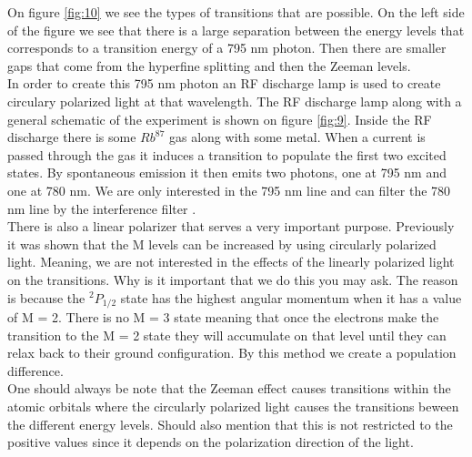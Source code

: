 \documentclass[twocolumn]{article}
\begin{document}
On figure \ref{fig:10} we see the 
types of transitions that are possible. On the left side of the figure we see 
that there is a large separation between the energy levels that corresponds to 
a transition energy of a 795 nm photon. Then there are smaller gaps that come 
from the hyperfine splitting and then the Zeeman levels.
\\
In order to create this 795 nm photon an RF discharge lamp is used to create 
circulary polarized light at that wavelength. The RF discharge lamp along with 
a general schematic of the experiment is shown on figure \ref{fig:9}. Inside 
the RF discharge there is some $Rb^{87}$ gas along with some metal. When a 
current is passed through the gas it induces a transition to populate the 
first two excited states. By spontaneous emission it then emits two photons, 
one at 795 nm and one at 780 nm. We are only interested in the 795 nm line 
and can filter the 780 nm line by the interference filter \cite{ref:3}.
\\
There is also a linear polarizer that serves a very important purpose. 
Previously it was shown that the M levels can be increased by using circularly 
polarized light. Meaning, we are not interested in the effects of the linearly 
polarized light on the transitions. Why is it important that we do this you 
may ask. The reason is because the $^2P_{1/2}$ state has the highest angular 
momentum when it has a value of M = 2. There is no M = 3 state meaning that once 
the electrons make the transition to the M = 2 state they will accumulate on 
that level until they can relax back to their ground configuration. By this 
method we create a population difference.
\\
One should always be note that the Zeeman effect causes transitions within the 
atomic orbitals where the circularly polarized light causes the transitions 
beween the different energy levels. Should also mention that this is not 
restricted to the positive values since it depends on the polarization 
direction of the light.
\end{document}
